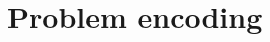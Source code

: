 \renewcommand*\chappic{img/satisfiability.pdf}  %
\renewcommand*\chapquote{What idiot called them logic errors rather than bool shit?}  %
\renewcommand*\chapquotesrc{Unknown}
\chapter{Problem encoding}
\label{ch:enc}
\vspace{50pt}
